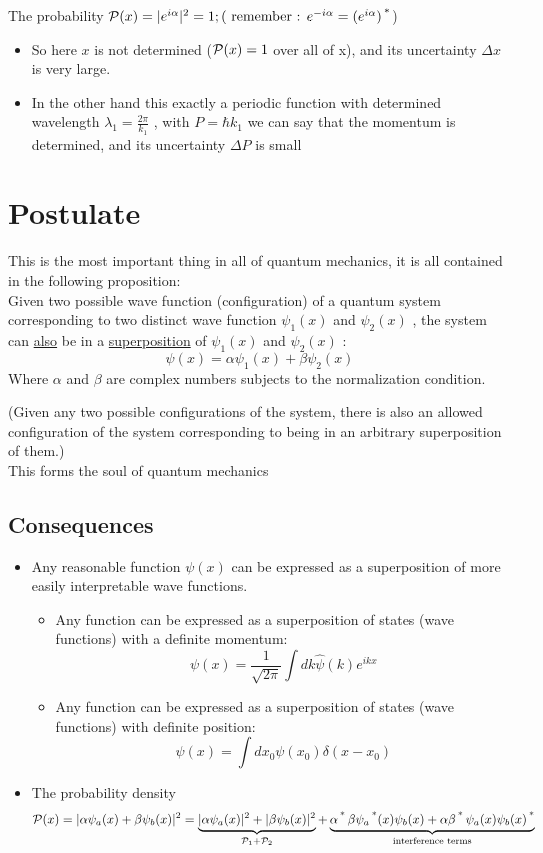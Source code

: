 \documentclass[12pt,oneside]{book}
\begin{document}
\begin{itemize}
	      The probability $\mathcal{P}(x) = |e^{i\alpha}|^2 = 1 ;( \text{ remember : }e^{-i\alpha} = (e^{i\alpha})\operatorname{^*}$)
	      \begin{itemize}
		      \item So here $x$ is not determined ($\mathcal{P}(x) =1 $ over all of x), and its uncertainty $\Delta x $ is very large.
		      \item In the other hand this exactly a periodic function with determined wavelength $\lambda_1 = \frac{ 2\pi}{k_1}$ , with $P = \hbar k_1$ we can say that the momentum is determined, and its uncertainty $\Delta P $ is  small\\
	      \end{itemize}
\end{itemize}

\section{Postulate }
This is the most important thing in all of quantum mechanics, it is all contained in the following proposition:\\
Given two possible wave function (configuration) of a quantum system corresponding to two distinct wave function $\psi_1(x)$ and $\psi_2(x)$ , the system can \underline{also} be in a \underline{superposition}  of $\psi_1(x)$ and $\psi_2(x)$ :
\[\boxed{\psi(x) = \alpha\psi_1(x) + \beta\psi_2(x)}\]
Where $\alpha$ and $\beta$ are complex numbers subjects to the normalization condition.
\begin{center}
	(Given any two possible configurations of the system, there is also an allowed configuration of the system corresponding to being in an arbitrary superposition of them.)\\
	This forms the soul of quantum mechanics
\end{center}
\subsection{Consequences}
\begin{itemize}
	\item Any reasonable function $\psi(x)$ can be expressed as a superposition of more easily interpretable wave functions.
	      \begin{itemize}
		      \item Any function can be expressed as a superposition of  states (wave functions)  with a definite momentum:
		            \[ \psi(x) = \frac{1}{\sqrt{2\pi}}\int dk \widehat{\psi}(k)e^{ikx} \]
		      \item Any function can be expressed as a superposition of states (wave functions) with definite position:
		            \[ \psi(x) = \int dx_0 \psi(x_0)\delta(x-x_0) \]
	      \end{itemize}
	\item The probability density
	      \[ \mathcal{P}(x) = |\alpha\psi_a(x) + \beta\psi_b(x)|^2 = \underbrace{|\alpha \psi_a(x)|^2+|\beta\psi_b(x)|^2}_{\mathcal{P}_1 + \mathcal{P}_2}+\underbrace{\alpha\operatorname{^*}\beta\psi_a\operatorname{^*}(x)\psi_b(x) + \alpha\beta\operatorname{^*}\psi_a(x)\psi_b(x)\operatorname{^*}}_\text{interference terms} \]
\end{itemize}
\end{document}

